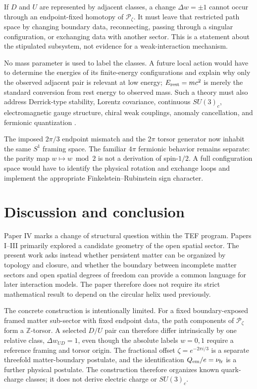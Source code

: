 \documentclass[aps,prd,reprint,superscriptaddress,nofootinbib,longbibliography,floatfix]{revtex4-2}
\newcommand{\nufr}{\nu_{\mathrm{fr}}}
\begin{document}
If $D$ and $U$ are represented by adjacent classes, a change $\Delta w=\pm1$ cannot occur through an endpoint-fixed homotopy of $\mathcal P_\zeta$. It must leave that restricted path space by changing boundary data, reconnecting, passing through a singular configuration, or exchanging data with another sector. This is a statement about the stipulated subsystem, not evidence for a weak-interaction mechanism.

No mass parameter is used to label the classes. A future local action would have to determine the energies of its finite-energy configurations and explain why only the observed adjacent pair is relevant at low energy; $E_{\rm rest}=mc^2$ is merely the standard conversion from rest energy to observed mass. Such a theory must also address Derrick-type stability, Lorentz covariance, continuous $SU(3)_c$, electromagnetic gauge structure, chiral weak couplings, anomaly cancellation, and fermionic quantization \cite{Derrick1964}.

The imposed $2\pi/3$ endpoint mismatch and the $2\pi$ torsor generator now inhabit the same $S^1$ framing space. The familiar $4\pi$ fermionic behavior remains separate: the parity map $w\mapsto w\bmod2$ is not a derivation of spin-$1/2$. A full configuration space would have to identify the physical rotation and exchange loops and implement the appropriate Finkelstein--Rubinstein sign character.

\section{Discussion and conclusion}

Paper IV marks a change of structural question within the TEF program. Papers I--III primarily explored a candidate geometry of the open spatial sector. The present work asks instead whether persistent matter can be organized by topology and closure, and whether the boundary between incomplete matter sectors and open spatial degrees of freedom can provide a common language for later interaction models. The paper therefore does not require its strict mathematical result to depend on the circular helix used previously.

The concrete construction is intentionally limited. For a fixed boundary-exposed framed matter sub-sector with fixed endpoint data, the path components of $\mathcal P_\zeta$ form a $\mathbb Z$-torsor. A selected $D/U$ pair can therefore differ intrinsically by one relative class, $\Delta w_{UD}=1$, even though the absolute labels $w=0,1$ require a reference framing and torsor origin. The fractional offset $\zeta=e^{-2\pi i/3}$ is a separate threefold matter-boundary postulate, and the identification $Q_{\rm em}/e=\nufr$ is a further physical postulate. The construction therefore organizes known quark-charge classes; it does not derive electric charge or $SU(3)_c$.
\end{document}
